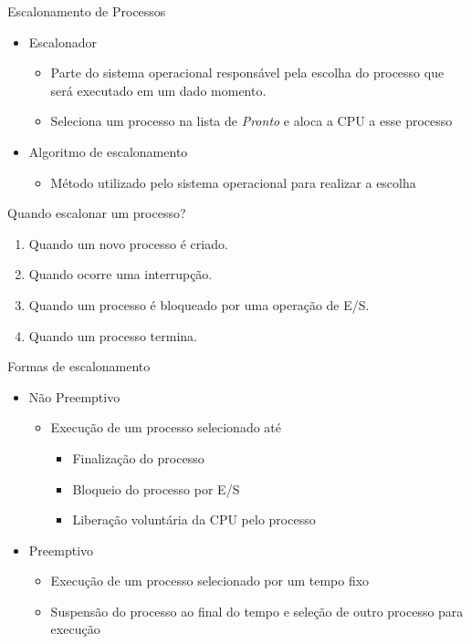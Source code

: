\documentclass[aspectratio=169,
				xcolor=table]{beamer}
\begin{document}
	\begin{frame}{Escalonamento de Processos}
		\begin{itemize}
			\item Escalonador
			\begin{itemize}
				\item Parte do sistema operacional responsável pela escolha do processo que será executado em um dado momento.
				\item Seleciona um processo na lista de \textit{Pronto} e aloca a CPU a esse processo
			\end{itemize}
			\vspace{1em}
			\item Algoritmo de escalonamento
			\begin{itemize}
				\item Método utilizado pelo sistema operacional para realizar a escolha
			\end{itemize}
		\end{itemize}
	\end{frame}
	
	\begin{frame}{Quando escalonar um processo?}
		\begin{enumerate}
			\item Quando um novo processo é criado.
			\vspace{0.75em}
			\item Quando ocorre uma interrupção.
			\vspace{0.75em}		
			\item Quando um processo é bloqueado por uma operação de E/S.
			\vspace{0.75em}
			\item Quando um processo termina.			
		\end{enumerate}
	\end{frame}
		
	\begin{frame}{Formas de escalonamento}
		\begin{itemize}
			\item Não Preemptivo
			\begin{itemize}
				\item Execução de um processo selecionado até
				\begin{itemize}
					\item Finalização do processo
					\item Bloqueio do processo por E/S
					\item Liberação voluntária da CPU pelo processo
				\end{itemize}
			\end{itemize}
			\vspace{1em}			
			\item Preemptivo
			\begin{itemize}
				\item Execução de um processo selecionado por um tempo fixo
				\item Suspensão do processo ao final do tempo e seleção de outro processo para execução
			\end{itemize}
		\end{itemize}		
	\end{frame}
	
\end{document}
